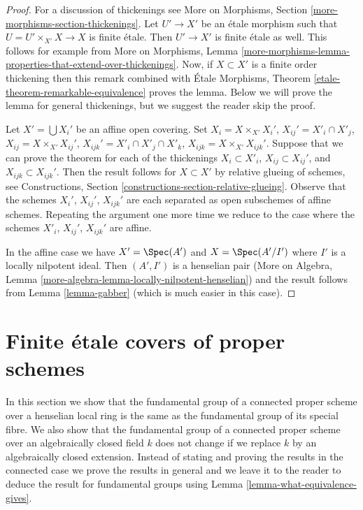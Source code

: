 \begin{proof}
For a discussion of thickenings see
More on Morphisms, Section \ref{more-morphisms-section-thickenings}.
Let $U' \to X'$ be an \'etale morphism such that $U = U' \times_{X'} X \to X$
is finite \'etale. Then $U' \to X'$ is finite \'etale as well.
This follows for example from More on Morphisms, Lemma
\ref{more-morphisms-lemma-properties-that-extend-over-thickenings}.
Now, if $X \subset X'$ is a finite order thickening then this remark
combined with \'Etale Morphisms, Theorem
\ref{etale-theorem-remarkable-equivalence}
proves the lemma. Below we will prove the lemma for general thickenings, but
we suggest the reader skip the proof.

\medskip\noindent
Let $X' = \bigcup X_i'$ be an affine open covering. Set
$X_i = X \times_{X'} X_i'$, $X_{ij}' = X'_i \cap X'_j$,
$X_{ij} = X \times_{X'} X_{ij}'$, $X_{ijk}' = X'_i \cap X'_j \cap X'_k$,
$X_{ijk} = X \times_{X'} X_{ijk}'$.
Suppose that we can prove
the theorem for each of the thickenings
$X_i \subset X'_i$, $X_{ij} \subset X_{ij}'$, and $X_{ijk} \subset X_{ijk}'$.
Then the result follows for $X \subset X'$ by relative glueing of
schemes, see
Constructions, Section \ref{constructions-section-relative-glueing}.
Observe that the schemes $X_i'$, $X_{ij}'$, $X_{ijk}'$ are
each separated as open subschemes of affine schemes. Repeating the
argument one more time we reduce to the case where the schemes
$X'_i$, $X_{ij}'$, $X_{ijk}'$ are affine.

\medskip\noindent
In the affine case we have $X' = \Spec(A')$ and $X = \Spec(A'/I')$
where $I'$ is a locally nilpotent ideal. Then $(A', I')$ is a
henselian pair (More on Algebra, Lemma
\ref{more-algebra-lemma-locally-nilpotent-henselian})
and the result follows from Lemma \ref{lemma-gabber} (which is
much easier in this case).
\end{proof}










\section{Finite \'etale covers of proper schemes}
\label{section-finite-etale-over-proper}

\noindent
In this section we show that the fundamental group of a connected proper
scheme over a henselian local ring is the same as the fundamental
group of its special fibre. We also show that the fundamental
group of a connected proper scheme over an algebraically closed field $k$
does not change if we replace $k$ by an algebraically closed extension.
Instead of stating and proving the results in the connected case
we prove the results in general and we leave it to the reader to deduce
the result for fundamental groups using
Lemma \ref{lemma-what-equivalence-gives}.

